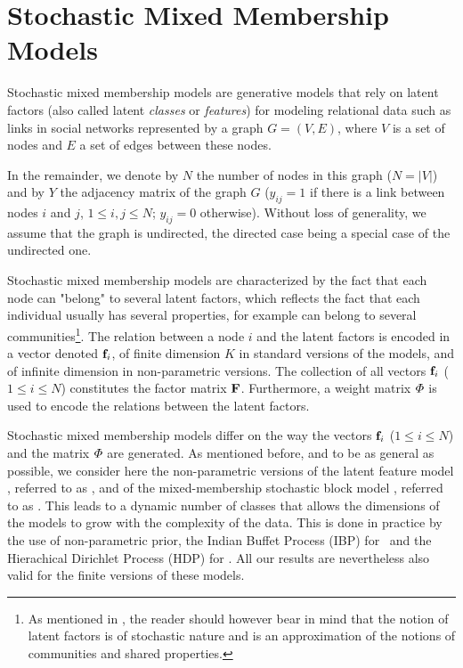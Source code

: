 \section{Stochastic Mixed Membership Models}
\label{sec:background}

Stochastic mixed membership models are generative models that rely on latent factors (also called latent \textit{classes} or \textit{features}) for modeling relational data such as links in social networks represented by a graph $G=(V,E)$, where $V$ is a set of nodes and $E$ a set of edges between these nodes.

In the remainder, we denote by $N$ the number of nodes in this graph ($N = |V|$) and by $Y$ the adjacency matrix of the graph $G$ ($y_{ij}=1$ if there is a link between nodes $i$ and $j$, $1 \le i,j \le N$; $y_{ij} = 0$ otherwise). Without loss of generality, we assume that the graph is undirected, the directed case being a special case of the undirected one.

Stochastic mixed membership models are characterized by the fact that each node can "belong" to several latent factors, which reflects the fact that each individual usually has several properties, for example can belong to several communities\footnote{As mentioned in \cite{goldenberg2010survey}, the reader should however bear in mind that the notion of latent factors is of stochastic nature and is an approximation of the notions of communities and shared properties.}. The relation between a node $i$ and the latent factors is encoded in a vector denoted $\mathbf{f}_{i}$, of finite dimension $K$ in standard versions of the models, and of infinite dimension in  non-parametric versions. The collection of all vectors $\mathbf{f}_{i}$ ($1 \le i \le N$) constitutes the factor matrix $\mathbf{F}$. Furthermore, a weight matrix $\mat{\Phi}$ is used to encode the relations between the latent factors.

Stochastic mixed membership models differ on the way the vectors $\mathbf{f}_{i}$ ($1 \le i \le N$) and the matrix $\mat{\Phi}$ are generated. As mentioned before, and to be as general as possible, we consider here the non-parametric versions of the latent feature model \cite{miller2009nonparametric}, referred to as \ifm, and of the mixed-membership stochastic block model \cite{koutsourelakis2008finding,fan2015dynamic}, referred to as \imb. This leads to a dynamic number of classes that allows the dimensions of the models to grow with the complexity of the data. This is done in practice by the use of non-parametric prior,  the Indian Buffet Process (IBP) for \ifm\ and the Hierachical Dirichlet Process (HDP)  for \imb. All our results are nevertheless also valid for the finite versions of these models.

